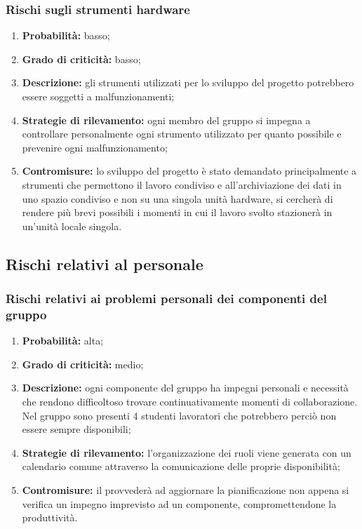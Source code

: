 \subsubsection{Rischi sugli strumenti hardware}
\begin{enumerate}
	\item \textbf{Probabilità:} basso;
	\item \textbf{Grado di criticità:} basso;
	\item \textbf{Descrizione:} gli strumenti utilizzati per lo sviluppo del progetto potrebbero essere soggetti a malfunzionamenti;
	\item \textbf{Strategie di rilevamento:} ogni membro del gruppo si impegna a controllare personalmente ogni strumento utilizzato per quanto possibile e prevenire ogni malfunzionamento;
	\item \textbf{Contromisure:} lo sviluppo del progetto è stato demandato principalmente a strumenti che permettono il lavoro condiviso e all’archiviazione dei dati in uno spazio condiviso e non su una singola unità hardware, si cercherà di rendere più brevi possibili i momenti in cui il lavoro svolto stazionerà in un’unità locale singola.
\end{enumerate}

\subsection{Rischi relativi al personale}
\subsubsection{Rischi relativi ai problemi personali dei componenti del gruppo}
\begin{enumerate}
	\item \textbf{Probabilità:} alta;
	\item \textbf{Grado di criticità:} medio;
	\item \textbf{Descrizione:} ogni componente del gruppo ha impegni personali e necessità che rendono difficoltoso trovare continuativamente momenti di collaborazione. Nel gruppo sono presenti 4 studenti lavoratori che potrebbero perciò non essere sempre disponibili;
	\item \textbf{Strategie di rilevamento:} l’organizzazione dei ruoli viene generata con un calendario comune attraverso la comunicazione delle proprie disponibilità;
	\item \textbf{Contromisure:} il \Responsabile provvederà ad aggiornare la pianificazione non appena si verifica un impegno imprevisto ad un componente, compromettendone la produttività.
\end{enumerate}

